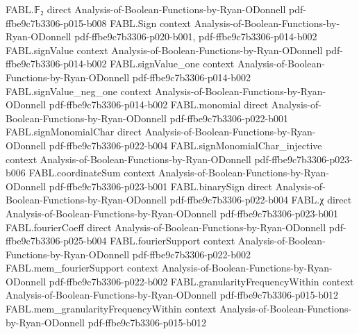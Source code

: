 \begin{theorem}
\leanok
{}
\proofstep
  {FABL.𝔽₂}
  {direct}
  {Analysis-of-Boolean-Functions-by-Ryan-ODonnell}
  {pdf-ffbe9c7b3306-p015-b008}
\proofstep
  {FABL.Sign}
  {context}
  {Analysis-of-Boolean-Functions-by-Ryan-ODonnell}
  {pdf-ffbe9c7b3306-p020-b001,
    pdf-ffbe9c7b3306-p014-b002}
\proofstep
  {FABL.signValue}
  {context}
  {Analysis-of-Boolean-Functions-by-Ryan-ODonnell}
  {pdf-ffbe9c7b3306-p014-b002}
\proofstep
  {FABL.signValue_one}
  {context}
  {Analysis-of-Boolean-Functions-by-Ryan-ODonnell}
  {pdf-ffbe9c7b3306-p014-b002}
\proofstep
  {FABL.signValue_neg_one}
  {context}
  {Analysis-of-Boolean-Functions-by-Ryan-ODonnell}
  {pdf-ffbe9c7b3306-p014-b002}
\proofstep
  {FABL.monomial}
  {direct}
  {Analysis-of-Boolean-Functions-by-Ryan-ODonnell}
  {pdf-ffbe9c7b3306-p022-b001}
\proofstep
  {FABL.signMonomialChar}
  {direct}
  {Analysis-of-Boolean-Functions-by-Ryan-ODonnell}
  {pdf-ffbe9c7b3306-p022-b004}
\proofstep
  {FABL.signMonomialChar_injective}
  {context}
  {Analysis-of-Boolean-Functions-by-Ryan-ODonnell}
  {pdf-ffbe9c7b3306-p023-b006}
\proofstep
  {FABL.coordinateSum}
  {context}
  {Analysis-of-Boolean-Functions-by-Ryan-ODonnell}
  {pdf-ffbe9c7b3306-p023-b001}
\proofstep
  {FABL.binarySign}
  {direct}
  {Analysis-of-Boolean-Functions-by-Ryan-ODonnell}
  {pdf-ffbe9c7b3306-p022-b004}
\proofstep
  {FABL.χ}
  {direct}
  {Analysis-of-Boolean-Functions-by-Ryan-ODonnell}
  {pdf-ffbe9c7b3306-p023-b001}
\proofstep
  {FABL.fourierCoeff}
  {direct}
  {Analysis-of-Boolean-Functions-by-Ryan-ODonnell}
  {pdf-ffbe9c7b3306-p025-b004}
\proofstep
  {FABL.fourierSupport}
  {context}
  {Analysis-of-Boolean-Functions-by-Ryan-ODonnell}
  {pdf-ffbe9c7b3306-p022-b002}
\proofstep
  {FABL.mem_fourierSupport}
  {context}
  {Analysis-of-Boolean-Functions-by-Ryan-ODonnell}
  {pdf-ffbe9c7b3306-p022-b002}
\proofstep
  {FABL.granularityFrequencyWithin}
  {context}
  {Analysis-of-Boolean-Functions-by-Ryan-ODonnell}
  {pdf-ffbe9c7b3306-p015-b012}
\proofstep
  {FABL.mem_granularityFrequencyWithin}
  {context}
  {Analysis-of-Boolean-Functions-by-Ryan-ODonnell}
  {pdf-ffbe9c7b3306-p015-b012}
\proofstep

\end{theorem}
